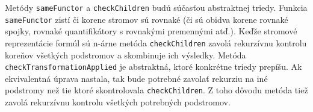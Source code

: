 Metódy \texttt{sameFunctor} a \texttt{checkChildren} budú súčasťou abstraktnej triedy. Funkcia \texttt{sameFunctor} zistí či korene stromov sú rovnaké (či sú obidva korene rovnaké spojky, rovnaké quantifikátory s rovnakými premennými atď.). Keďže stromové reprezentácie formúl sú n-árne metóda \texttt{checkChildren} zavolá rekurzívnu kontrolu koreňov všetkých podstromov a skombinuje ich výsledky. Metóda \texttt{checkTransformationApplied} je abstraktná, ktoré konkrétne triedy prepíšu. Ak ekvivalentná úprava nastala, tak bude potrebné zavolať rekurziu na iné podstromy než tie ktoré skontrolovala \texttt{checkChildren}. Z toho dôvodu metóda tiež zavolá rekurzívnu kontrolu všetkých potrebných podstromov.



